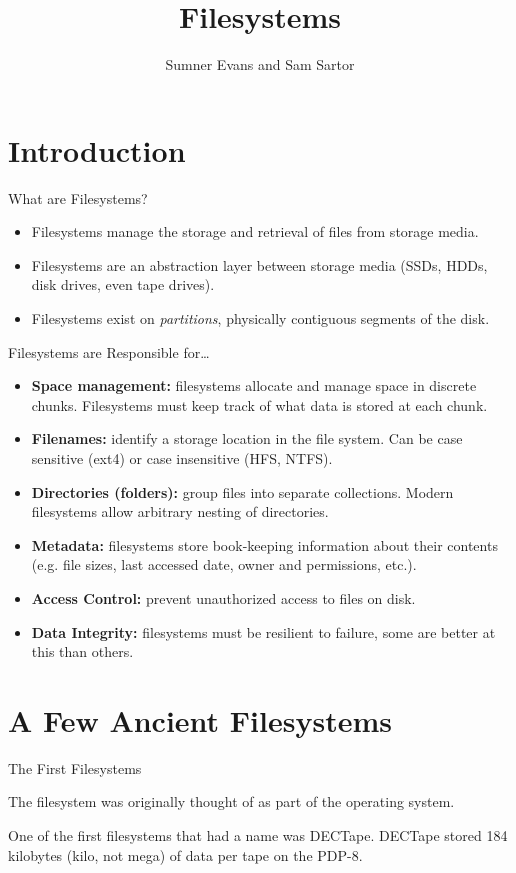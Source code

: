 \documentclass{lug}
\title{Filesystems}
\author{Sumner Evans and Sam Sartor}
\institute{Mines Linux Users Group}
\newcommand{\splitslide}[4]{
    \noindent
    \begin{minipage}{#1 \textwidth - #2 }
        #3
    \end{minipage}%
    \hspace{ \dimexpr #2 * 2 \relax }%
    \begin{minipage}{\textwidth - #1 \textwidth - #2 }
        #4
    \end{minipage}
}
\begin{document}
\section{Introduction}

\begin{frame}{What are Filesystems?}
    \begin{itemize}
        \item Filesystems manage the storage and retrieval of files from storage
            media.
        \item Filesystems are an abstraction layer between storage media (SSDs,
            HDDs, disk drives, even tape drives).
        \item Filesystems exist on \textit{partitions}, physically contiguous
            segments of the disk.
    \end{itemize}
\end{frame}

\begin{frame}{Filesystems are Responsible for\ldots}
    \begin{itemize}
        \item \textbf{Space management:} filesystems allocate and manage space
            in discrete chunks. Filesystems must keep track of what data is
            stored at each chunk.
        \item \textbf{Filenames:} identify a storage location in the file
            system. Can be case sensitive (ext4) or case insensitive (HFS,
            NTFS).
        \item \textbf{Directories (folders):} group files into separate
            collections. Modern filesystems allow arbitrary nesting of
            directories.
        \item \textbf{Metadata:} filesystems store book-keeping information
            about their contents (e.g. file sizes, last accessed date, owner and
            permissions, etc.).
        \item \textbf{Access Control:} prevent unauthorized access to files on
            disk.
        \item \textbf{Data Integrity:} filesystems must be resilient to failure,
            some are better at this than others.
    \end{itemize}
\end{frame}

\section{A Few Ancient Filesystems}
\begin{frame}{The First Filesystems}
    \splitslide{0.60}{1em}{
        The filesystem was originally thought of as part of the operating
        system.

        One of the first filesystems that had a name was DECTape. DECTape stored
        184 kilobytes (kilo, not mega) of data per tape on the PDP-8.
    }{}
\end{frame}
\end{document}
